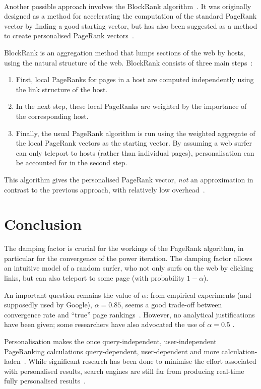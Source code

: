 \documentclass[a4paper,english,11pt]{scrartcl}
\begin{document}
\paragraph{}
Another possible approach involves the BlockRank algorithm~\cite{Kamvar03exploitingthe}. It was originally designed as
a method for accelerating the computation of the standard PageRank vector by finding a good starting
vector, but has also been suggested as a method to create personalised PageRank vectors~\cite{deeper}. 

BlockRank is an aggregation method that lumps sections of the web by hosts, using the natural structure of the web. 
BlockRank consists of three main steps~\cite{deeper}:
\begin{enumerate}
 \item First, local PageRanks for pages in a host are computed independently using the link structure of the host.
 \item In the next step, these local PageRanks are weighted by the importance of the corresponding
host. 
\item Finally, the usual PageRank algorithm is run using the weighted aggregate of the local
PageRank vectors as the starting vector. By assuming a web surfer can only teleport to hosts (rather
than individual pages), personalisation can be accounted for in the second step. 
\end{enumerate}
This algorithm gives the personalised PageRank vector, \emph{not} an approximation in contrast to the previous approach,
with relatively low overhead~\cite{deeper}. 

\section{Conclusion}
The damping factor is crucial for the workings of the PageRank algorithm, in particular for the convergence of the power iteration. The damping factor allows an intuitive model of a random surfer, who not only surfs on the web by clicking links, but can also teleport to some page (with probability $1-\alpha$). 

An important question remains the value of $\alpha$: from empirical experiments (and supposedly used by Google), $\alpha=0.85$, seems a good trade-off between convergence rate and ``true'' page rankings~\cite{Page1998,math}. However, no analytical justifications have been given; some researchers have also advocated the use of $\alpha=0.5$ \cite{Avrachenkov06asingular,function,Bressan:2009:CDC:1506844.1506853}.

Personalisation makes the once query-independent, user-independent PageRanking calculations query-dependent, user-dependent and more calculation-laden~\cite{deeper}.
While significant research has been done to minimise the effort associated with personalised results, search engines are still far from producing real-time fully personalised results~\cite{thesis}. 


\clearpage


\end{document}
